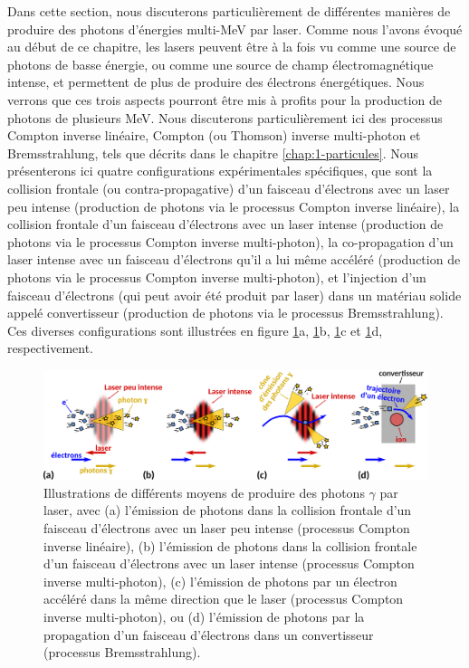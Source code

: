 \begin{refsection}
Dans cette section, nous discuterons particulièrement de différentes manières de produire des photons d'énergies multi-MeV par laser. Comme nous l'avons évoqué au début de ce chapitre, les lasers peuvent être à la fois vu comme une source de photons de basse énergie, ou comme une source de champ électromagnétique intense, et permettent de plus de produire des électrons énergétiques. Nous verrons que ces trois aspects pourront être mis à profits pour la production de photons de plusieurs MeV. Nous discuterons particulièrement ici des processus Compton inverse linéaire, Compton (ou Thomson) inverse multi-photon et Bremsstrahlung, tels que décrits dans le chapitre \ref{chap:1-particules}. Nous présenterons ici quatre configurations expérimentales spécifiques, que sont la collision frontale (ou contra-propagative) d'un faisceau d'électrons avec un laser peu intense (production de photons via le processus Compton inverse linéaire), la collision frontale d'un faisceau d'électrons avec un laser intense (production de photons via le processus Compton inverse multi-photon), la co-propagation d'un laser intense avec un faisceau d'électrons qu'il a lui même accéléré (production de photons via le processus Compton inverse multi-photon), et l'injection d'un faisceau d'électrons (qui peut avoir été produit par laser) dans un matériau solide appelé convertisseur (production de photons via le processus Bremsstrahlung). Ces diverses configurations sont illustrées en figure \ref{fig:2-config_gamma_laser}a, \ref{fig:2-config_gamma_laser}b, \ref{fig:2-config_gamma_laser}c et \ref{fig:2-config_gamma_laser}d, respectivement.

\begin{figure}[hbtp]
    \centering
    \includegraphics[width=\linewidth]{2-laser/config_gamma_laser.png}
    \caption{Illustrations de différents moyens de produire des photons $\gamma$ par laser, avec (a) l'émission de photons dans la collision frontale d'un faisceau d'électrons avec un laser peu intense (processus Compton inverse linéaire), (b) l'émission de photons dans la collision frontale d'un faisceau d'électrons avec un laser intense (processus Compton inverse multi-photon), (c) l'émission de photons par un électron accéléré dans la même direction que le laser (processus Compton inverse multi-photon), ou (d) l'émission de photons par la propagation d'un faisceau d'électrons dans un convertisseur (processus Bremsstrahlung). }
    \label{fig:2-config_gamma_laser}
\end{figure}


\end{refsection}
